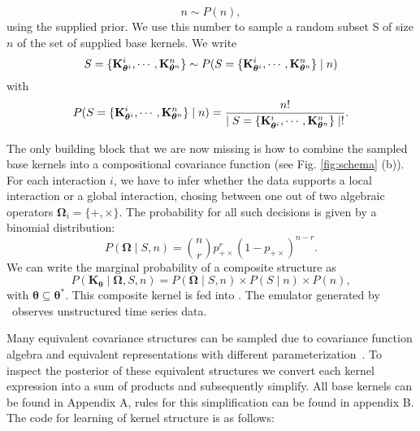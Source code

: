 \[
n \sim P(n),
\]
using the supplied prior. We use this number to sample a random subset S of size $n$ of
the set of supplied base kernels. We write
\[
S = \{\mathbf{K}_{\bm{\theta}^i}^i,\cdots,\mathbf{K}_{\bm{\theta}^n}^n\}
\sim P(S = \{\mathbf{K}_{\bm{\theta}^i}^i,\cdots,\mathbf{K}_{\bm{\theta}^n}^n\} \mid n) 
\]
with
\[
P(S = \{\mathbf{K}_{\bm{\theta}^i}^i,\cdots,\mathbf{K}_{\bm{\theta}^n}^n\}\mid n) = \frac{n!}{ \mid S = \{\mathbf{K}_{\bm{\theta}^i}^i,\cdots,\mathbf{K}_{\bm{\theta}^n}^n\}\mid !}.
\]

The only building block that we are now missing is how to combine the sampled
base kernels into a compositional covariance function (see Fig. \ref{fig:schema}
(b)). For each interaction $i$, we
have to infer whether the data supports a local interaction or a global interaction,
chosing between one out of two algebraic operators
$\bm{\Omega}_i=\{+,\times\}$. The probability for all such decisions is given by a binomial distribution: 
\begin{equation}
P(\bm{\Omega} \mid S,n)= {n \choose r}  p_{+\times}^r (1 - p_{+\times})^{n-r}.
\end{equation}
We can write the marginal probability of a composite structure as
\begin{equation}
P(\mathbf{K}_{\bm{\theta}} \mid \bm{\Omega},S,n) = P(\bm{\Omega} \mid S,n)\times P(S \mid n) \times P(n),
\end{equation}
with $\bm{\theta}\subseteq \bm{\theta}^*$. This  composite kernel is fed into \gpmem. 
The emulator generated by \gpmem\ observes unstructured time series data. 








Many equivalent covariance structures can be sampled due to covariance function algebra
and equivalent representations with different parameterization~\citep{lloyd2014automatic}.
To inspect the posterior of these equivalent structures we convert each kernel expression
into a sum of products and subsequently simplify. All base kernels can be found in Appendix A,
rules for this simplification can be found in appendix B. The code for learning of kernel structure 
is as follows:

